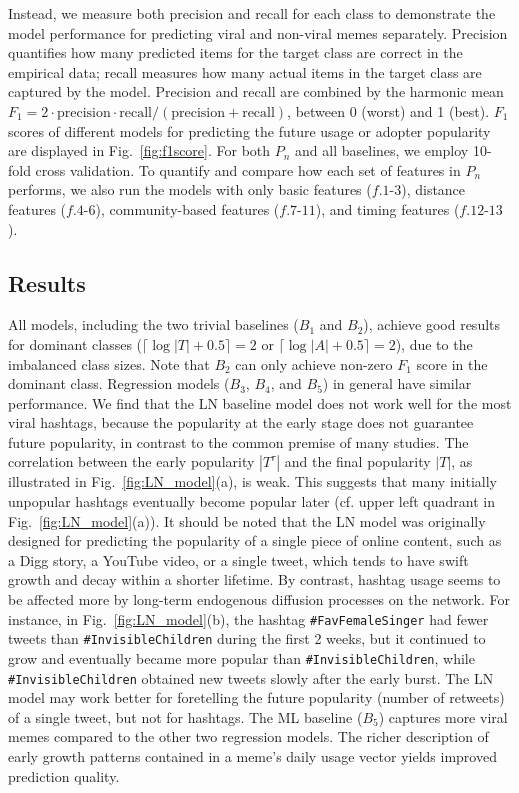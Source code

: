 \documentclass[letterpaper]{article}
\begin{document}
Instead, we measure both precision and recall for each class to demonstrate the model performance for predicting viral and non-viral memes separately. Precision quantifies how many predicted items for the target class are correct in the empirical data; recall measures how many actual items in the target class are captured by the model.
Precision and recall are combined by the harmonic mean $F_1 = 2 \cdot \text{precision} \cdot \text{recall} / (\text{precision} + \text{recall})$,  between 0 (worst) and 1 (best). $F_1$ scores of different models for predicting the future usage or adopter popularity are displayed in Fig.~\ref{fig:f1score}.
For both $P_n$ and all baselines, we employ 10-fold cross validation.
To quantify and compare how each set of features in $P_n$ performs, we also run the models with only basic features ($f.1$-$3$), distance features ($f.4$-$6$), community-based features ($f.7$-$11$), and timing features ($f.12$-$13$).



\subsection{Results}

All models, including the two trivial baselines ($B_1$ and $B_2$), achieve good results for dominant classes ($\lceil \log |T| + 0.5 \rceil =2$ or $\lceil \log |A| + 0.5 \rceil = 2$), due to the imbalanced class sizes. Note that $B_2$ can only achieve non-zero $F_1$ score in the dominant class.
Regression models ($B_3$, $B_4$, and $B_5$) in general have similar performance.
We find that the LN baseline model does not work well for the most viral hashtags, because the popularity at the early stage does not guarantee future popularity, in contrast to the common premise of many studies. The correlation between the early popularity $|T^{\tau}|$ and the final popularity $|T|$, as illustrated in Fig.~\ref{fig:LN_model}(a), is weak. This suggests that many initially unpopular hashtags eventually become popular later (cf. upper left quadrant in Fig.~\ref{fig:LN_model}(a)).
It should be noted that the LN model was originally designed for predicting the popularity of a single piece of online content, such as a Digg story, a YouTube video, or a single tweet, which tends to have swift growth and decay within a shorter lifetime. By contrast, hashtag usage seems to be affected more by long-term endogenous diffusion processes on the network. For instance, in Fig.~\ref{fig:LN_model}(b), the hashtag \texttt{\#FavFemaleSinger} had fewer tweets than \texttt{\#InvisibleChildren} during the first 2 weeks, but it continued to grow and eventually became more popular than \texttt{\#InvisibleChildren}, while \texttt{\#InvisibleChildren} obtained new tweets slowly after the early burst. The LN model may work better for foretelling the future popularity (number of retweets) of a single tweet, but not for hashtags.
The ML baseline ($B_5$) captures more viral memes compared to the other two regression models. The richer description of early growth patterns contained in a meme's daily usage vector yields improved  prediction quality.
\end{document}
